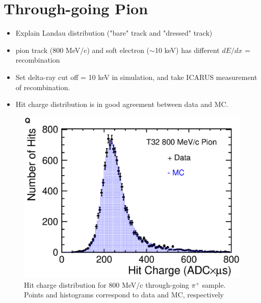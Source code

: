 \section{Through-going Pion}
\label{Sec:Pion}
\begin{itemize}
\item Explain Landau distribution ("bare" track and "dressed" track)
\item pion track (800 MeV/c) and soft electron ($\sim$10 keV) has different $dE/dx$ = recombination
\item Set delta-ray cut off = 10 keV in simulation, and take ICARUS measurement of recombination.
\item Hit charge distribution is in good agreement between data and MC.
\end{itemize}

\begin{figure}[htbp]
 \begin{center}
  \includegraphics[width=0.8\hsize]{fig/PionLandau.eps}
 \end{center}
 \caption{Hit charge distribution for 800 MeV/c through-going $\pi^+$ sample. Points and histograms correspond to data and MC, respectively}
 \label{Fig:PionLandau}
\end{figure}
